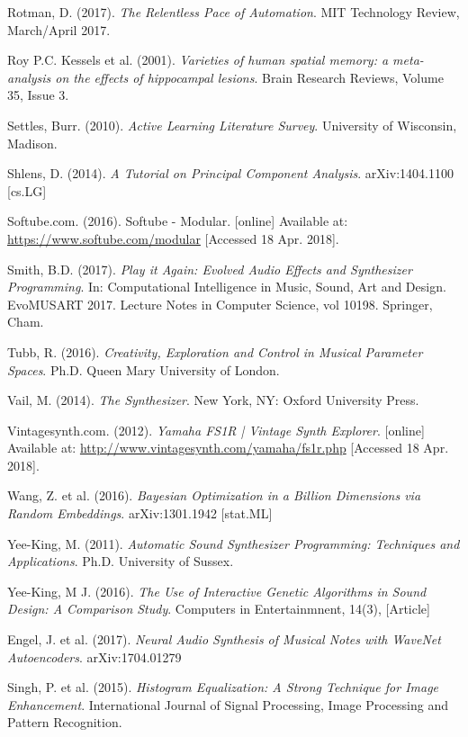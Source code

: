 \documentclass[11pt, oneside]{report}   	%
\begin{document}
{\begin{thebibliography}{9}
Rotman, D. (2017). \emph{The Relentless Pace of Automation}. MIT Technology Review, March/April 2017.

Roy P.C. Kessels et al. (2001). \emph{Varieties of human spatial memory: a meta-analysis on the effects of hippocampal lesions}.
Brain Research Reviews,
Volume 35, Issue 3.

Settles, Burr. (2010). \emph{Active Learning Literature Survey}. University of Wisconsin, Madison.

Shlens, D. (2014). \emph{A Tutorial on Principal Component Analysis}. arXiv:1404.1100 [cs.LG]

Softube.com. (2016). Softube - Modular. [online] Available at: \url{https://www.softube.com/modular} [Accessed 18 Apr. 2018].

Smith, B.D. (2017). \emph{Play it Again: Evolved Audio Effects and Synthesizer Programming}. In: Computational Intelligence in Music, Sound, Art and Design. EvoMUSART 2017. Lecture Notes in Computer Science, vol 10198. Springer, Cham.

Tubb, R. (2016). \emph{Creativity, Exploration and Control in Musical Parameter Spaces}. Ph.D. Queen Mary University of London.

Vail, M. (2014). \emph{The Synthesizer}. New York, NY: Oxford University Press.

Vintagesynth.com. (2012). \emph{Yamaha FS1R | Vintage Synth Explorer}. [online] Available at: \url{http://www.vintagesynth.com/yamaha/fs1r.php} [Accessed 18 Apr. 2018].

Wang, Z. et al. (2016). \emph{Bayesian Optimization in a Billion Dimensions via Random Embeddings}. arXiv:1301.1942 [stat.ML]

Yee-King, M. (2011). \emph{Automatic Sound Synthesizer Programming: Techniques and Applications}. Ph.D. University of Sussex.

Yee-King, M J. (2016). \emph{The Use of Interactive Genetic Algorithms in Sound Design: A Comparison Study}. Computers in Entertainmnent, 14(3), [Article]

 Engel, J. et al. (2017). \emph{Neural Audio Synthesis of Musical Notes with WaveNet Autoencoders}. arXiv:1704.01279 

Singh, P. et al. (2015). \emph{Histogram Equalization: A Strong Technique for Image Enhancement}. International Journal of Signal Processing, Image Processing and Pattern Recognition. %


\end{thebibliography}}
\end{document}
